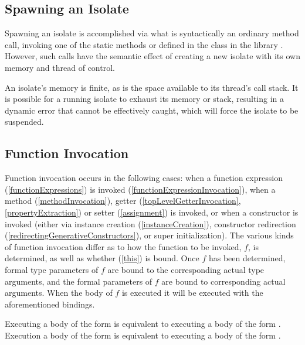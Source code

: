 \documentclass[makeidx]{article}
\begin{document}
{\subsection{Spawning an Isolate}

\LMHash{}%
Spawning an isolate is accomplished via what is syntactically an ordinary method call,
invoking one of the static methods  or  defined in the  class in the library .
However, such calls have the semantic effect of creating a new isolate with its own memory and thread of control.

\LMHash{}%
An isolate's memory is finite, as is the space available to its thread's call stack.
It is possible for a running isolate to exhaust its memory or stack,
resulting in a dynamic error that cannot be effectively caught,
which will force the isolate to be suspended.



\subsection{Function Invocation}

\LMHash{}%
Function invocation occurs in the following cases:
when a function expression (\ref{functionExpressions}) is invoked (\ref{functionExpressionInvocation}),
when a method (\ref{methodInvocation}), getter (\ref{topLevelGetterInvocation}, \ref{propertyExtraction}) or setter (\ref{assignment}) is invoked,
or when a constructor is invoked
(either via instance creation (\ref{instanceCreation}), constructor redirection (\ref{redirectingGenerativeConstructors}), or super initialization).
The various kinds of function invocation differ as to how the function to be invoked, $f$, is determined, as well as whether \THIS{} (\ref{this}) is bound.
Once $f$ has been determined,
formal type parameters of $f$ are bound to the corresponding actual type arguments,
and the formal parameters of $f$ are bound to corresponding actual arguments.
When the body of $f$ is executed it will be executed with the aforementioned bindings.

\LMHash{}%
Executing a body of the form  is equivalent to executing a body of the form .
Execution a body of the form  is equivalent to executing a body of the form .

}
\end{document}

